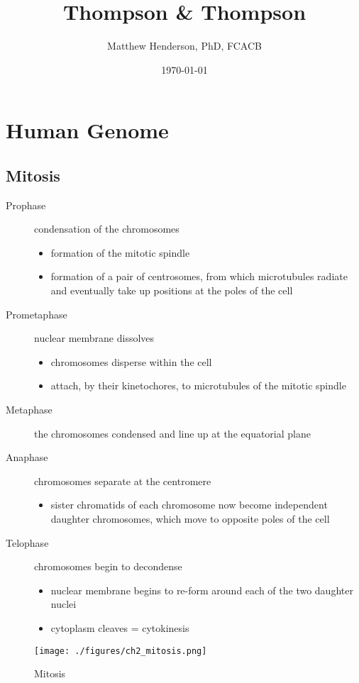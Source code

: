 \documentclass[12pt]{scrartcl}
\author{Matthew Henderson, PhD, FCACB}
\date{\today}
\title{Thompson \& Thompson}
\begin{document}
\maketitle
\setcounter{tocdepth}{1}
\tableofcontents


\section{Human Genome}
\label{sec:org68552ed}
\subsection{Mitosis}
\label{sec:org10b57c7}
\begin{description}
\item[{Prophase}] condensation of the chromosomes
\begin{itemize}
\item formation of the mitotic spindle
\item formation of a pair of centrosomes, from which microtubules
radiate and eventually take up positions at the poles of the cell
\end{itemize}
\item[{Prometaphase}] nuclear membrane dissolves
\begin{itemize}
\item chromosomes disperse within the cell
\item attach, by their kinetochores, to microtubules of the mitotic
spindle
\end{itemize}
\item[{Metaphase}] the chromosomes condensed and line up at the equatorial
plane
\item[{Anaphase}] chromosomes separate at the centromere
\begin{itemize}
\item sister chromatids of each chromosome now become independent
daughter chromosomes, which move to opposite poles of the cell
\end{itemize}
\item[{Telophase}] chromosomes begin to decondense
\begin{itemize}
\item nuclear membrane begins to re-form around each of the two daughter
nuclei
\item cytoplasm cleaves = cytokinesis
\end{itemize}
\end{description}

\begin{figure}[htbp]
\centering
\texttt{[image: ./figures/ch2\_mitosis.png]}
\caption{\label{fig:orgfaa4255}Mitosis}
\end{figure}
\end{document}
